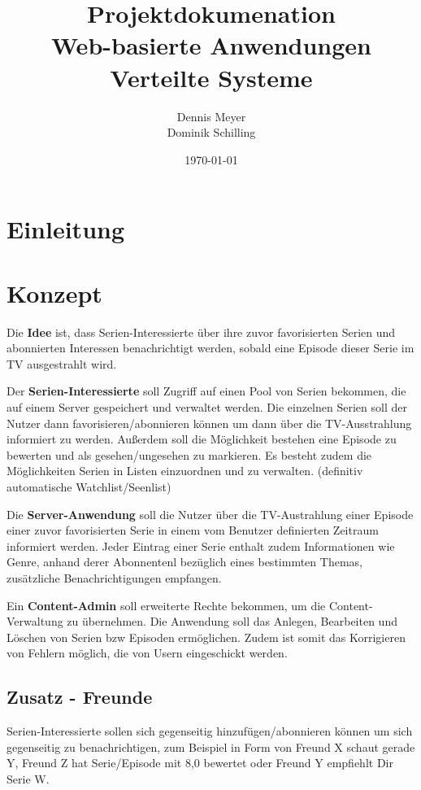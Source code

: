 \documentclass[a4paper]{article}
\title{Projektdokumenation\\Web-basierte Anwendungen\\Verteilte Systeme}
\author{Dennis Meyer\\Dominik Schilling}
\date{\today}
\begin{document}
\maketitle

\newpage

\tableofcontents

\newpage


\section{Einleitung}

\section{Konzept}

Die \textbf{Idee} ist, dass Serien-Interessierte über ihre zuvor favorisierten Serien und abonnierten Interessen benachrichtigt werden, sobald eine Episode dieser Serie im TV ausgestrahlt wird.

\parskip 12pt
\parindent 0pt
Der \textbf{Serien-Interessierte} soll Zugriff auf einen Pool von Serien bekommen, die auf einem Server gespeichert und verwaltet werden.
Die einzelnen Serien soll der Nutzer dann favorisieren/abonnieren können um dann über die TV-Ausstrahlung informiert zu werden.
Außerdem soll die Möglichkeit bestehen eine Episode zu bewerten und als gesehen/ungesehen zu markieren. Es besteht zudem die Möglichkeiten Serien in Listen einzuordnen und zu verwalten. (definitiv automatische Watchlist/Seenlist)

\parskip 12pt
\parindent 0pt
Die \textbf{Server-Anwendung} soll die Nutzer über die TV-Austrahlung einer Episode einer zuvor favorisierten Serie in einem vom Benutzer definierten Zeitraum informiert werden. Jeder Eintrag einer Serie enthalt zudem Informationen wie Genre, anhand derer Abonnentenl bezüglich eines bestimmten Themas, zusätzliche Benachrichtigungen empfangen.

\parskip 12pt
\parindent 0pt
Ein \textbf{Content-Admin} soll erweiterte Rechte bekommen, um die Content-Verwaltung zu übernehmen. Die Anwendung soll das Anlegen, Bearbeiten und Löschen von Serien bzw Episoden ermöglichen. Zudem ist somit das Korrigieren von Fehlern möglich, die von Usern eingeschickt werden.

\subsection{Zusatz - Freunde}
Serien-Interessierte sollen sich gegenseitig hinzufügen/abonnieren können um sich gegenseitig zu benachrichtigen, zum Beispiel in Form von Freund X schaut gerade Y, Freund Z hat Serie/Episode mit 8,0 bewertet oder Freund Y empfiehlt Dir Serie W.
\end{document}
